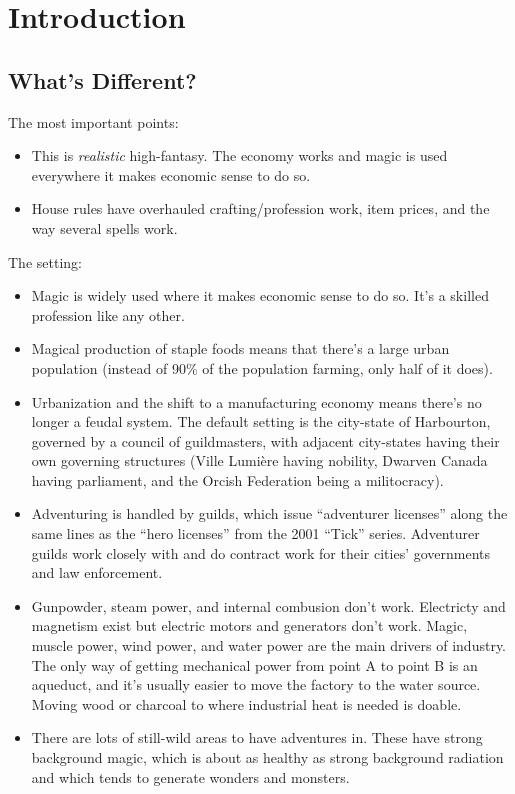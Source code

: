 
\chapter{Introduction}
\label{sect-over}

%
%
%
\section{What's Different?}
\label{sect-over-intro}


The most important points:
\begin{itemize}
%
\item This is \textit{realistic} high-fantasy. The economy works and magic
is used everywhere it makes economic sense to do so.
%
\item House rules have overhauled crafting/profession work, item prices, and
the way several spells work.
%
\end{itemize}

The setting:
\begin{itemize}
%
\item Magic is widely used where it makes economic sense to do so. It's a
skilled profession like any other.
%
\item Magical production of staple foods means that there's a large urban
population (instead of 90\% of the population farming, only half of it does).
%
\item Urbanization and the shift to a manufacturing economy means there's
no longer a feudal system. The default setting is the city-state of
Harbourton, governed by a council of guildmasters, with adjacent city-states
having their own governing structures (Ville Lumi\`{e}re having nobility,
Dwarven Canada having parliament, and the Orcish Federation being a
militocracy).
%
\item Adventuring is handled by guilds, which issue ``adventurer licenses''
along the same lines as the ``hero licenses'' from the 2001 ``Tick'' series.
Adventurer guilds work closely with and do contract work for their cities'
governments and law enforcement.
%
\item Gunpowder, steam power, and internal combusion don't work. Electricty
and magnetism exist but electric motors and generators don't work. Magic,
muscle power, wind power, and water power are the main drivers of industry.
The only way of getting mechanical power from point A to point B is an
aqueduct, and it's usually easier to move the factory to the water source.
Moving wood or charcoal to where industrial heat is needed is doable.
%
\item There are lots of still-wild areas to have adventures in. These have
strong background magic, which is about as healthy as strong background
radiation and which tends to generate wonders and monsters.
%
\end{itemize}

